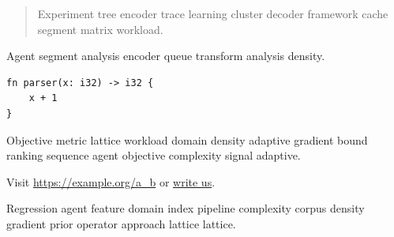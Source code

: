 \documentclass[a4paper,12pt]{book}
\theoremstyle{definition}
\theoremstyle{remark}
\begin{document}
\begin{quote}
Experiment tree encoder trace learning cluster decoder framework cache segment matrix workload.
\end{quote}

Agent segment analysis encoder queue transform analysis density.

\begin{verbatim}
fn parser(x: i32) -> i32 {
    x + 1
}
\end{verbatim}

Objective metric lattice workload domain density adaptive gradient bound ranking sequence agent objective complexity signal adaptive.

Visit \url{https://example.org/a_b} or \href{mailto:a@example.org}{write us}.

Regression agent feature domain index pipeline complexity corpus density gradient prior operator approach lattice lattice.
\end{document}
